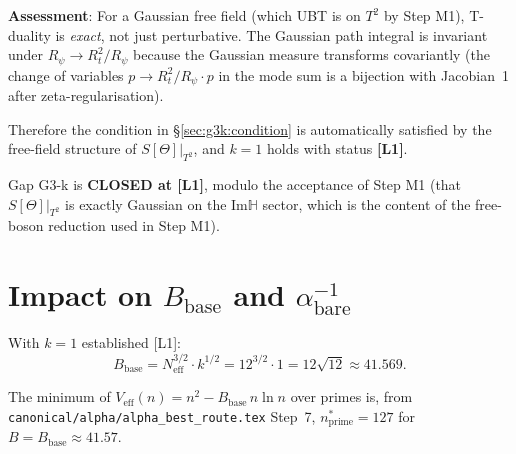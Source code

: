 \documentclass[12pt,a4paper]{article}
\theoremstyle{definition}
\theoremstyle{remark}
\begin{document}
\begin{resultbox}
\textbf{Assessment}: For a Gaussian free field (which UBT is on $T^2$
by Step M1), T-duality is \emph{exact}, not just perturbative.
The Gaussian path integral is invariant under $R_\psi \to R_t^2/R_\psi$
because the Gaussian measure transforms covariantly (the change of variables
$p\to R_t^2/R_\psi \cdot p$ in the mode sum is a bijection with Jacobian~1 after
zeta-regularisation).

Therefore the condition in §\ref{sec:g3k:condition} is automatically satisfied by
the free-field structure of $S[\Theta]|_{T^2}$, and $k = 1$ holds with status
\textbf{[L1]}.

Gap G3-k is \textbf{CLOSED at [L1]}, modulo the acceptance of Step M1
(that $S[\Theta]|_{T^2}$ is exactly Gaussian on the Im$\mathbb{H}$ sector,
which is the content of the free-boson reduction used in Step M1).
\end{resultbox}

\section{Impact on $B_{\mathrm{base}}$ and $\alpha^{-1}_{\mathrm{bare}}$}
\label{sec:g3k:impact}

With $k = 1$ established [L1]:
\begin{equation}
  B_{\mathrm{base}}
  = N_{\mathrm{eff}}^{3/2} \cdot k^{1/2}
  = 12^{3/2} \cdot 1
  = 12\sqrt{12}
  \approx 41.569.
  \label{eq:g3k:Bbase}
\end{equation}

The minimum of $V_{\mathrm{eff}}(n) = n^2 - B_{\mathrm{base}}\,n\ln n$ over
primes is, from \texttt{canonical/alpha/alpha\_best\_route.tex} Step~7,
$n^*_{\mathrm{prime}} = 127$ for $B = B_{\mathrm{base}} \approx 41.57$.
\end{document}
